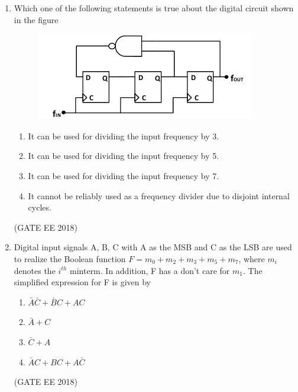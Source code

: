 \documentclass[journal,12pt,onecolumn]{IEEEtran}
\theoremstyle{remark}
\begin{document}
\begin{enumerate}
\item Which one of the following statements is true about the digital circuit shown in the figure
\begin{figure}[H]
    \centering
    \includegraphics[]{figs/Q.36.png}
    \caption{}
    \label{fig:16}
\end{figure}
\begin{enumerate}
    \item It can be used for dividing the input frequency by 3.
    \item It can be used for dividing the input frequency by 5.
    \item It can be used for dividing the input frequency by 7.
    \item It cannot be reliably used as a frequency divider due to disjoint internal cycles.
\end{enumerate}
\hfill{(GATE EE 2018)}

\item Digital input signals A, B, C with A as the MSB and C as the LSB are used to realize the Boolean function $F = m_0 + m_2 + m_3 + m_5 + m_7$, where $m_i$ denotes the $i^{th}$ minterm. In addition, F has a don't care for $m_1$. The simplified expression for F is given by
\begin{multicols}{2}
\begin{enumerate}
    \item $\bar{A}\bar{C} + \bar{B}C + AC$
    \item $\bar{A} + C$
    \item $\bar{C} + A$
    \item $\bar{A}C + BC + A\bar{C}$
\end{enumerate}
\end{multicols}
\hfill{(GATE EE 2018)}


\end{enumerate}
\end{document}
